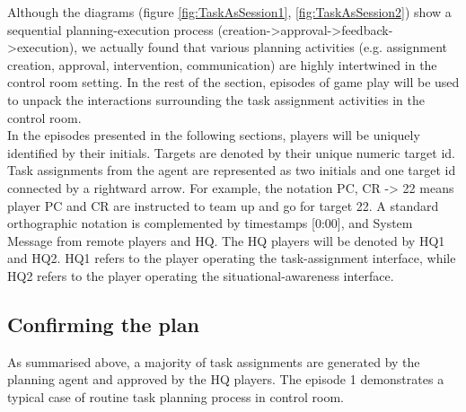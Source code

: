 Although the diagrams (figure \ref{fig:TaskAsSession1}, \ref{fig:TaskAsSession2}) show a sequential planning-execution process (creation->approval->feedback->execution), we actually found that various planning activities (e.g. assignment creation, approval, intervention, communication) are highly intertwined in the control room setting. In the rest of the section, episodes of game play will be used to unpack the interactions surrounding the task assignment activities in the control room.\\

In the episodes presented in the following sections, players will be uniquely identified by their initials. Targets are denoted by their unique numeric target id. Task assignments from the agent are represented as two initials and one target id connected by a rightward arrow. For example, the notation PC, CR -> 22 means player PC and CR are instructed to team up and go for target 22. A standard orthographic notation is complemented by timestamps [0:00], and System Message from remote players and HQ. The HQ players will be denoted by HQ1 and HQ2. HQ1 refers to the player operating the task-assignment interface, while HQ2 refers to the player operating the situational-awareness interface.\\

\subsection{Confirming the plan}
As summarised above, a majority of task assignments are generated by the planning agent and approved by the HQ players. The episode 1 demonstrates a typical case of routine task planning process in control room. \\

